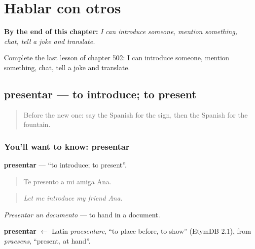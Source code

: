 
\chapter{Hablar con otros}
\label{ch:es-hablar-con-otros}

\begin{chapteropening}
\textbf{By the end of this chapter:} \emph{I can introduce someone, mention something, chat, tell a joke and translate.}

Complete the last lesson of chapter 502: I can introduce someone, mention something, chat, tell a joke and translate.
\end{chapteropening}

\section[presentar]{presentar — to introduce; to present}

\label{lesson:ES-C502-presentar}



\begin{quote}
Before the new one: say the Spanish for the sign, then the Spanish for the fountain.
\end{quote}

\subsection*{You'll want to know: presentar}
\textbf{presentar} — \textquotedblleft{}to introduce; to present\textquotedblright{}.

\begin{quote}
Te presento a mi amiga Ana.
\end{quote}

\begin{quote}
\emph{Let me introduce my friend Ana.}
\end{quote}

\emph{Presentar un documento} — to hand in a document.

\begin{cousinweb}
\textbf{presentar} $\leftarrow$ Latin \emph{praesentare}, \textquotedblleft{}to place before, to show\textquotedblright{} (EtymDB 2.1), from \emph{praesens}, \textquotedblleft{}present, at hand\textquotedblright{}.
\end{cousinweb}

